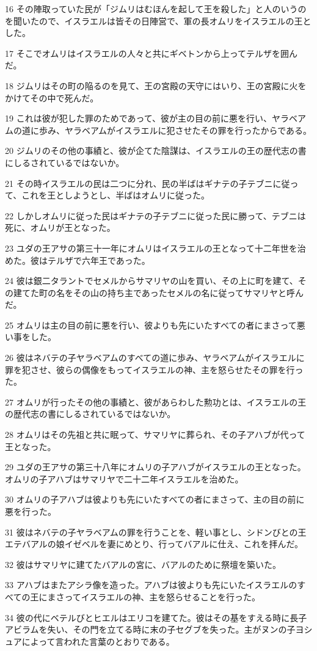 \par 16 その陣取っていた民が「ジムリはむほんを起して王を殺した」と人のいうのを聞いたので、イスラエルは皆その日陣営で、軍の長オムリをイスラエルの王とした。
\par 17 そこでオムリはイスラエルの人々と共にギベトンから上ってテルザを囲んだ。
\par 18 ジムリはその町の陥るのを見て、王の宮殿の天守にはいり、王の宮殿に火をかけてその中で死んだ。
\par 19 これは彼が犯した罪のためであって、彼が主の目の前に悪を行い、ヤラベアムの道に歩み、ヤラベアムがイスラエルに犯させたその罪を行ったからである。
\par 20 ジムリのその他の事績と、彼が企てた陰謀は、イスラエルの王の歴代志の書にしるされているではないか。
\par 21 その時イスラエルの民は二つに分れ、民の半ばはギナテの子テブニに従って、これを王としようとし、半ばはオムリに従った。
\par 22 しかしオムリに従った民はギナテの子テブニに従った民に勝って、テブニは死に、オムリが王となった。
\par 23 ユダの王アサの第三十一年にオムリはイスラエルの王となって十二年世を治めた。彼はテルザで六年王であった。
\par 24 彼は銀二タラントでセメルからサマリヤの山を買い、その上に町を建て、その建てた町の名をその山の持ち主であったセメルの名に従ってサマリヤと呼んだ。
\par 25 オムリは主の目の前に悪を行い、彼よりも先にいたすべての者にまさって悪い事をした。
\par 26 彼はネバテの子ヤラベアムのすべての道に歩み、ヤラベアムがイスラエルに罪を犯させ、彼らの偶像をもってイスラエルの神、主を怒らせたその罪を行った。
\par 27 オムリが行ったその他の事績と、彼があらわした勲功とは、イスラエルの王の歴代志の書にしるされているではないか。
\par 28 オムリはその先祖と共に眠って、サマリヤに葬られ、その子アハブが代って王となった。
\par 29 ユダの王アサの第三十八年にオムリの子アハブがイスラエルの王となった。オムリの子アハブはサマリヤで二十二年イスラエルを治めた。
\par 30 オムリの子アハブは彼よりも先にいたすべての者にまさって、主の目の前に悪を行った。
\par 31 彼はネバテの子ヤラベアムの罪を行うことを、軽い事とし、シドンびとの王エテバアルの娘イゼベルを妻にめとり、行ってバアルに仕え、これを拝んだ。
\par 32 彼はサマリヤに建てたバアルの宮に、バアルのために祭壇を築いた。
\par 33 アハブはまたアシラ像を造った。アハブは彼よりも先にいたイスラエルのすべての王にまさってイスラエルの神、主を怒らせることを行った。
\par 34 彼の代にベテルびとヒエルはエリコを建てた。彼はその基をすえる時に長子アビラムを失い、その門を立てる時に末の子セグブを失った。主がヌンの子ヨシュアによって言われた言葉のとおりである。

